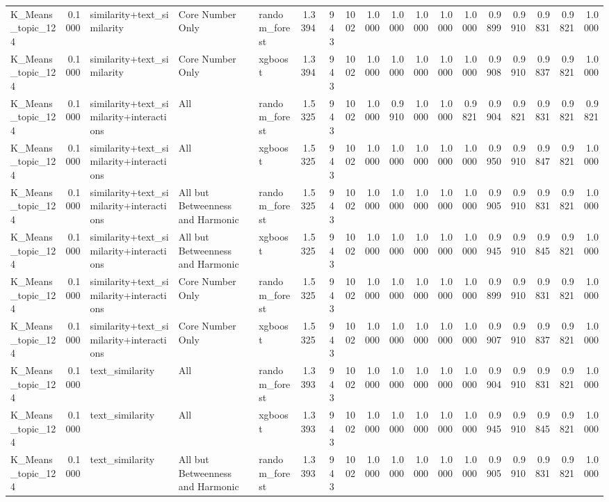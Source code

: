 \begin{tabular}{lrlllrrrrrrrrrrrrr}
K_Means_topic_124 & 0.1000 & similarity+text_similarity & Core Number Only & random_forest & 1.3394 & 943 & 1002 & 1.0000 & 1.0000 & 1.0000 & 1.0000 & 1.0000 & 0.9899 & 0.9910 & 0.9831 & 0.9821 & 1.0000 \\
K_Means_topic_124 & 0.1000 & similarity+text_similarity & Core Number Only & xgboost & 1.3394 & 943 & 1002 & 1.0000 & 1.0000 & 1.0000 & 1.0000 & 1.0000 & 0.9908 & 0.9910 & 0.9837 & 0.9821 & 1.0000 \\
K_Means_topic_124 & 0.1000 & similarity+text_similarity+interactions & All & random_forest & 1.5325 & 943 & 1002 & 1.0000 & 0.9910 & 1.0000 & 1.0000 & 0.9821 & 0.9904 & 0.9821 & 0.9831 & 0.9821 & 0.9821 \\
K_Means_topic_124 & 0.1000 & similarity+text_similarity+interactions & All & xgboost & 1.5325 & 943 & 1002 & 1.0000 & 1.0000 & 1.0000 & 1.0000 & 1.0000 & 0.9950 & 0.9910 & 0.9847 & 0.9821 & 1.0000 \\
K_Means_topic_124 & 0.1000 & similarity+text_similarity+interactions & All but Betweenness and Harmonic & random_forest & 1.5325 & 943 & 1002 & 1.0000 & 1.0000 & 1.0000 & 1.0000 & 1.0000 & 0.9905 & 0.9910 & 0.9831 & 0.9821 & 1.0000 \\
K_Means_topic_124 & 0.1000 & similarity+text_similarity+interactions & All but Betweenness and Harmonic & xgboost & 1.5325 & 943 & 1002 & 1.0000 & 1.0000 & 1.0000 & 1.0000 & 1.0000 & 0.9945 & 0.9910 & 0.9845 & 0.9821 & 1.0000 \\
K_Means_topic_124 & 0.1000 & similarity+text_similarity+interactions & Core Number Only & random_forest & 1.5325 & 943 & 1002 & 1.0000 & 1.0000 & 1.0000 & 1.0000 & 1.0000 & 0.9899 & 0.9910 & 0.9831 & 0.9821 & 1.0000 \\
K_Means_topic_124 & 0.1000 & similarity+text_similarity+interactions & Core Number Only & xgboost & 1.5325 & 943 & 1002 & 1.0000 & 1.0000 & 1.0000 & 1.0000 & 1.0000 & 0.9907 & 0.9910 & 0.9837 & 0.9821 & 1.0000 \\
K_Means_topic_124 & 0.1000 & text_similarity & All & random_forest & 1.3393 & 943 & 1002 & 1.0000 & 1.0000 & 1.0000 & 1.0000 & 1.0000 & 0.9904 & 0.9910 & 0.9831 & 0.9821 & 1.0000 \\
K_Means_topic_124 & 0.1000 & text_similarity & All & xgboost & 1.3393 & 943 & 1002 & 1.0000 & 1.0000 & 1.0000 & 1.0000 & 1.0000 & 0.9945 & 0.9910 & 0.9845 & 0.9821 & 1.0000 \\
K_Means_topic_124 & 0.1000 & text_similarity & All but Betweenness and Harmonic & random_forest & 1.3393 & 943 & 1002 & 1.0000 & 1.0000 & 1.0000 & 1.0000 & 1.0000 & 0.9905 & 0.9910 & 0.9831 & 0.9821 & 1.0000 \\

\end{tabular}
